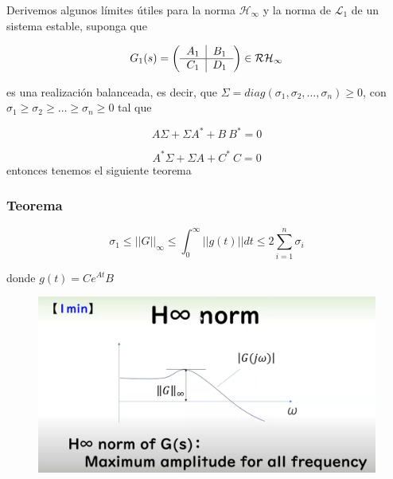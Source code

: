 Derivemos algunos límites útiles para la norma $\mathcal{H}_\infty$ y la norma de $\mathcal{L}_1$ de un sistema estable, suponga que

\begin{equation*}
    G_1(s) = \left( \begin{tabular}{c|c}$A_1$&$B_1$\\\hline$C_1$&$D_1$\end{tabular} \right) \in \mathcal{R H}_\infty
\end{equation*}

es una realización balanceada, es decir, que $\Sigma = diag(\sigma_1,\sigma_2,\dots,\sigma_n) \geq 0$, con $\sigma_1 \geq \sigma_2 \geq \dots \geq \sigma_n \geq 0$ tal que

\begin{equation*}
    A \Sigma + \Sigma A^{*} + B \ B^{*} = 0
\end{equation*}


\begin{equation*}
    A^{*} \Sigma + \Sigma A + C^{*} \ C  = 0
\end{equation*}
entonces tenemos el siguiente teorema

\subsubsection{Teorema} 

\begin{equation*}
    \sigma_1 \leq ||G||_\infty \leq \int_{0}^{\infty} ||g(t)|| dt \leq 2 \sum_{i=1}^{n} \sigma_i
\end{equation*}

donde $g(t) = Ce^{At}B$

\begin{figure}[H]
    \centering
    \includegraphics[scale = 0.5]{Control/controlf3.png}
\end{figure}


